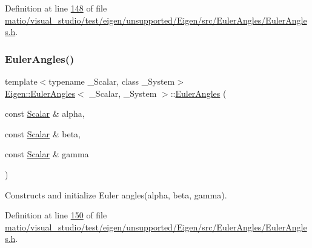 Definition at line \hyperlink{matio_2visual__studio_2test_2eigen_2unsupported_2_eigen_2src_2_euler_angles_2_euler_angles_8h_source_l00148}{148} of file \hyperlink{matio_2visual__studio_2test_2eigen_2unsupported_2_eigen_2src_2_euler_angles_2_euler_angles_8h_source}{matio/visual\+\_\+studio/test/eigen/unsupported/\+Eigen/src/\+Euler\+Angles/\+Euler\+Angles.\+h}.

\mbox{\label{class_eigen_1_1_euler_angles_a765135b6e5d35248517b4268046840b6}} 
\subsubsection{\texorpdfstring{Euler\+Angles()}{EulerAngles()}\hspace{0.1cm}{\footnotesize\ttfamily [8/12]}}
{\footnotesize\ttfamily template$<$typename \+\_\+\+Scalar, class \+\_\+\+System$>$ \\
\hyperlink{class_eigen_1_1_euler_angles}{Eigen\+::\+Euler\+Angles}$<$ \+\_\+\+Scalar, \+\_\+\+System $>$\+::\hyperlink{class_eigen_1_1_euler_angles}{Euler\+Angles} (\begin{DoxyParamCaption}\item[{const \hyperlink{class_eigen_1_1_euler_angles_a2ab1d433ac9683268446f8905ac31aac}{Scalar} \&}]{alpha,  }\item[{const \hyperlink{class_eigen_1_1_euler_angles_a2ab1d433ac9683268446f8905ac31aac}{Scalar} \&}]{beta,  }\item[{const \hyperlink{class_eigen_1_1_euler_angles_a2ab1d433ac9683268446f8905ac31aac}{Scalar} \&}]{gamma }\end{DoxyParamCaption})\hspace{0.3cm}{\ttfamily [inline]}}

Constructs and initialize Euler angles({\ttfamily alpha}, {\ttfamily beta}, {\ttfamily gamma}). 

Definition at line \hyperlink{matio_2visual__studio_2test_2eigen_2unsupported_2_eigen_2src_2_euler_angles_2_euler_angles_8h_source_l00150}{150} of file \hyperlink{matio_2visual__studio_2test_2eigen_2unsupported_2_eigen_2src_2_euler_angles_2_euler_angles_8h_source}{matio/visual\+\_\+studio/test/eigen/unsupported/\+Eigen/src/\+Euler\+Angles/\+Euler\+Angles.\+h}.

\mbox{\label{class_eigen_1_1_euler_angles_ae2f34ff915892795d3d304c5dd0eec42}} 
